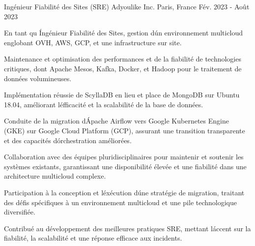 \begin{cventries}
  \cventry
    {Ingénieur Fiabilité des Sites (SRE)} %
    {Adyoulike Inc.} %
    {Paris, France} %
    {Fév. 2023 - Août 2023} %
    {
      \begin{cvitems} %
        \item {En tant qu \'  Ingénieur Fiabilité des Sites, gestion d\' un environnement multicloud englobant OVH, AWS, GCP, et une infrastructure sur site.}
        \item {Maintenance et optimisation des performances et de la fiabilité de technologies critiques, dont Apache Mesos, Kafka, Docker, et Hadoop pour le traitement de données volumineuses.}
        \item {Implémentation réussie de ScyllaDB en lieu et place de MongoDB sur Ubuntu 18.04, améliorant l\' efficacité et la scalabilité de la base de données.}
        \item {Conduite de la migration d\' Apache Airflow vers Google Kubernetes Engine (GKE) sur Google Cloud Platform (GCP), assurant une transition transparente et des capacités d\' orchestration améliorées.}
        \item {Collaboration avec des équipes pluridisciplinaires pour maintenir et soutenir les systèmes existants, garantissant une disponibilité élevée et une fiabilité dans une architecture multicloud complexe.}
        \item {Participation à la conception et l\' exécution d\' une stratégie de migration, traitant des défis spécifiques à un environnement multicloud et une pile technologique diversifiée.}
        \item {Contribué au développement des meilleures pratiques SRE, mettant l\' accent sur la fiabilité, la scalabilité et une réponse efficace aux incidents.}
      \end{cvitems}
    }


\end{cventries}
